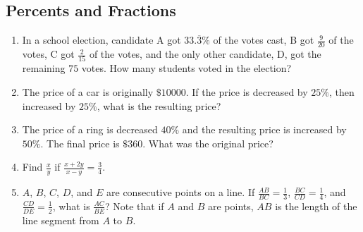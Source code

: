 \documentclass{article}
\begin{document}
    \subsection*{Percents and Fractions}
    \begin{enumerate}
        \item In a school election, candidate A got $33.\overline{3}\%$ of the
        votes cast, B got $\frac{9}{20}$ of the votes, C got $\frac{2}{15}$ of
        the votes, and the only other candidate, D, got the remaining $75$
        votes. How many students voted in the election?
        \vspace{3cm}
        \item The price of a car is originally $\$10000$. If the price is
        decreased by $25\%$, then increased by $25\%$, what is the resulting
        price?
        \vspace{3cm}
        \item The price of a ring is decreased $40\%$ and the resulting price is
        increased by $50\%$. The final price is $\$360$. What was the original
        price?
        \vspace{3cm}
        \item Find $\frac{x}{y}$ if $\frac{x + 2y}{x - y} = \frac{3}{4}$.
        \vspace{3cm}
        \item $A$, $B$, $C$, $D$, and $E$ are consecutive points on a line. If
        $\frac{AB}{BC} = \frac{1}{3}$, $\frac{BC}{CD} = \frac{1}{4}$, and
        $\frac{CD}{DE} = \frac{1}{2}$, what is $\frac{AC}{BE}$? Note that if $A$
        and $B$ are points, $AB$ is the length of the line segment from $A$ to
        $B$.
        \vspace{3cm}
    \end{enumerate}
\end{document}
